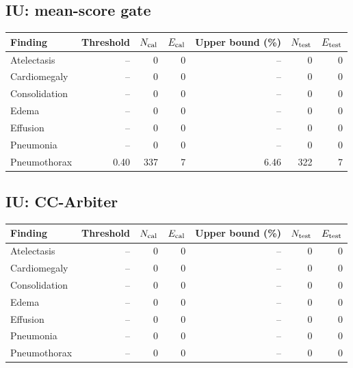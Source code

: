 \subsection{IU: mean-score gate}
\begin{center}\small
\begin{tabular}{lrrrrrr}
\toprule
Finding & Threshold & $N_{\rm cal}$ & $E_{\rm cal}$ & Upper bound (\%) & $N_{\rm test}$ & $E_{\rm test}$\\
\midrule
Atelectasis & -- & 0 & 0 & -- & 0 & 0\\
Cardiomegaly & -- & 0 & 0 & -- & 0 & 0\\
Consolidation & -- & 0 & 0 & -- & 0 & 0\\
Edema & -- & 0 & 0 & -- & 0 & 0\\
Effusion & -- & 0 & 0 & -- & 0 & 0\\
Pneumonia & -- & 0 & 0 & -- & 0 & 0\\
Pneumothorax & 0.40 & 337 & 7 & 6.46 & 322 & 7\\
\bottomrule\end{tabular}\end{center}
\subsection{IU: CC-Arbiter}
\begin{center}\small
\begin{tabular}{lrrrrrr}
\toprule
Finding & Threshold & $N_{\rm cal}$ & $E_{\rm cal}$ & Upper bound (\%) & $N_{\rm test}$ & $E_{\rm test}$\\
\midrule
Atelectasis & -- & 0 & 0 & -- & 0 & 0\\
Cardiomegaly & -- & 0 & 0 & -- & 0 & 0\\
Consolidation & -- & 0 & 0 & -- & 0 & 0\\
Edema & -- & 0 & 0 & -- & 0 & 0\\
Effusion & -- & 0 & 0 & -- & 0 & 0\\
Pneumonia & -- & 0 & 0 & -- & 0 & 0\\
Pneumothorax & -- & 0 & 0 & -- & 0 & 0\\
\bottomrule\end{tabular}\end{center}